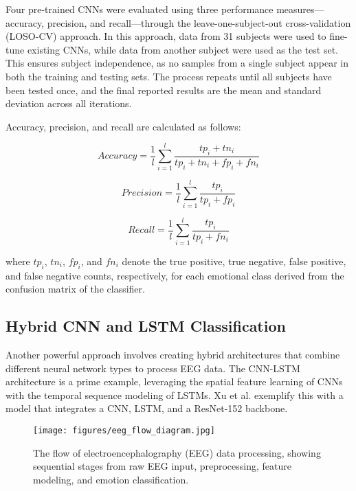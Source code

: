 \documentclass[conference]{IEEEtran}
\begin{document}
Four pre-trained CNNs were evaluated using three performance measures—accuracy, precision, and recall—through the leave-one-subject-out cross-validation (LOSO-CV) approach. In this approach, data from 31 subjects were used to fine-tune existing CNNs, while data from another subject were used as the test set. This ensures subject independence, as no samples from a single subject appear in both the training and testing sets. The process repeats until all subjects have been tested once, and the final reported results are the mean and standard deviation across all iterations.

Accuracy, precision, and recall are calculated as follows:

\begin{equation}
Accuracy = \frac{1}{l} \sum_{i=1}^{l} \frac{tp_i + tn_i}{tp_i + tn_i + fp_i + fn_i}
\end{equation}

\begin{equation}
Precision = \frac{1}{l} \sum_{i=1}^{l} \frac{tp_i}{tp_i + fp_i}
\end{equation}

\begin{equation}
Recall = \frac{1}{l} \sum_{i=1}^{l} \frac{tp_i}{tp_i + fn_i}
\end{equation}

where \(tp_i\), \(tn_i\), \(fp_i\), and \(fn_i\) denote the true positive, true negative, false positive, and false negative counts, respectively, for each emotional class derived from the confusion matrix of the classifier.


\subsection{Hybrid CNN and LSTM Classification}
Another powerful approach involves creating hybrid architectures that combine different neural network types to process EEG data. The CNN-LSTM architecture is a prime example, leveraging the spatial feature learning of CNNs with the temporal sequence modeling of LSTMs. Xu et al. \cite{b2} exemplify this with a model that integrates a CNN, LSTM, and a ResNet-152 backbone.

\begin{figure}[H]
    \centering
    \texttt{[image: figures/eeg\_flow\_diagram.jpg]}
    \caption{The flow of electroencephalography (EEG) data processing, showing sequential stages from raw EEG input, preprocessing, feature modeling, and emotion classification.}
    \label{fig:eeg_flow}
\end{figure}
\end{document}
